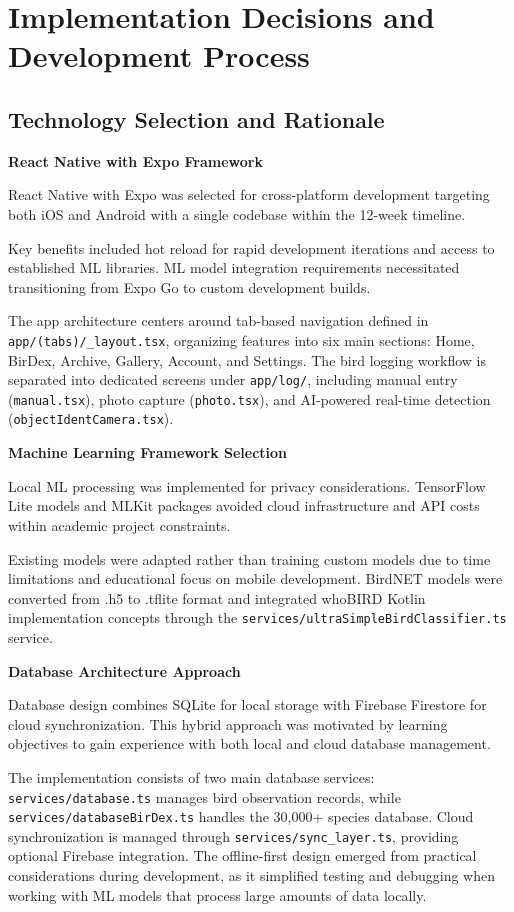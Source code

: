 \chapter{Implementation Decisions and Development Process}

\section{Technology Selection and Rationale}

\textbf{React Native with Expo Framework}

React Native with Expo was selected for cross-platform development targeting both iOS and Android with a single codebase within the 12-week timeline.

Key benefits included hot reload for rapid development iterations and access to established ML libraries. ML model integration requirements necessitated transitioning from Expo Go to custom development builds.

The app architecture centers around tab-based navigation defined in \texttt{app/(tabs)/\_layout.tsx}, organizing features into six main sections: Home, BirDex, Archive, Gallery, Account, and Settings. The bird logging workflow is separated into dedicated screens under \texttt{app/log/}, including manual entry (\texttt{manual.tsx}), photo capture (\texttt{photo.tsx}), and AI-powered real-time detection (\texttt{objectIdentCamera.tsx}).

\textbf{Machine Learning Framework Selection}

Local ML processing was implemented for privacy considerations. TensorFlow Lite models and MLKit packages avoided cloud infrastructure and API costs within academic project constraints.

Existing models were adapted rather than training custom models due to time limitations and educational focus on mobile development. BirdNET models were converted from .h5 to .tflite format and integrated whoBIRD Kotlin implementation concepts through the \texttt{services/ultraSimpleBirdClassifier.ts} service.

\textbf{Database Architecture Approach}

Database design combines SQLite for local storage with Firebase Firestore for cloud synchronization. This hybrid approach was motivated by learning objectives to gain experience with both local and cloud database management.

The implementation consists of two main database services: \texttt{services/database.ts} manages bird observation records, while \texttt{services/databaseBirDex.ts} handles the 30,000+ species database. Cloud synchronization is managed through \texttt{services/sync\_layer.ts}, providing optional Firebase integration. The offline-first design emerged from practical considerations during development, as it simplified testing and debugging when working with ML models that process large amounts of data locally.

